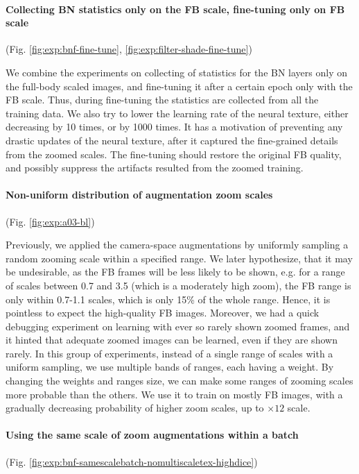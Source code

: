\vspace{-15pt}\paragraph{Collecting BN statistics only on the FB scale, fine-tuning only on FB scale}(Fig. \ref{fig:exp:bnf-fine-tune}, \ref{fig:exp:filter-shade-fine-tune})\mbox{}\nopagebreak

We combine the experiments on collecting of statistics for the BN layers only on the full-body scaled images, and fine-tuning it after a certain epoch only with the FB scale. Thus, during fine-tuning the statistics are collected from all the training data. We also try to lower the learning rate of the neural texture, either decreasing by 10 times, or by 1000 times. It has a motivation of preventing any drastic updates of the neural texture, after it captured the fine-grained details from the zoomed scales. The fine-tuning should restore the original FB quality, and possibly suppress the artifacts resulted from the zoomed training.

\vspace{-15pt}\paragraph{Non-uniform distribution of augmentation zoom scales}(Fig. \ref{fig:exp:a03-bl})\mbox{}\nopagebreak

Previously, we applied the camera-space augmentations by uniformly sampling a random zooming scale within a specified range. We later hypothesize, that it may be undesirable, as the FB frames will be less likely to be shown, e.g. for a range of scales between 0.7 and 3.5 (which is a moderately high zoom), the FB range is only within 0.7-1.1 scales, which is only 15\% of the whole range. Hence, it is pointless to expect the high-quality FB images. Moreover, we had a quick debugging experiment on learning with ever so rarely shown zoomed frames, and it hinted that adequate zoomed images can be learned, even if they are shown rarely. In this group of experiments, instead of a single range of scales with a uniform sampling, we use multiple bands of ranges, each having a weight. By changing the weights and ranges size, we can make some ranges of zooming scales more probable than the others. We use it to train on mostly FB images, with a gradually decreasing probability of higher zoom scales, up to $\times12$ scale.

\vspace{-15pt}\paragraph{Using the same scale of zoom augmentations within a batch}(Fig. \ref{fig:exp:bnf-samescalebatch-nomultiscaletex-highdice})\mbox{}\nopagebreak

